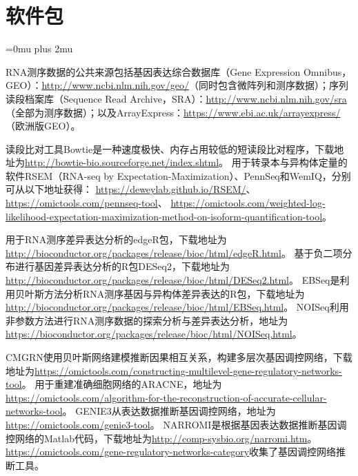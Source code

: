 \section*{软件包}
\begingroup
\sloppy
\Urlmuskip=0mu plus 2mu\relax
\def\UrlBreaks{\do\/\do\-\do\.\do\_\do\?\do\&\do\=\do\a\do\b\do\c\do\d\do\e\do\f\do\g\do\h\do\i\do\j\do\k\do\l\do\m\do\n\do\o\do\p\do\q\do\r\do\s\do\t\do\u\do\v\do\w\do\x\do\y\do\z\do\A\do\B\do\C\do\D\do\E\do\F\do\G\do\H\do\I\do\J\do\K\do\L\do\M\do\N\do\O\do\P\do\Q\do\R\do\S\do\T\do\U\do\V\do\W\do\X\do\Y\do\Z}

RNA测序数据的公共来源包括基因表达综合数据库（Gene Expression Omnibus，GEO）：\url{http://www.ncbi.nlm.nih.gov/geo/}（同时包含微阵列和测序数据）；序列读段档案库（Sequence Read Archive，SRA）：\url{http://www.ncbi.nlm.nih.gov/sra}（全部为测序数据）；以及ArrayExpress：\url{https://www.ebi.ac.uk/arrayexpress/}（欧洲版GEO）。

读段比对工具Bowtie是一种速度极快、内存占用较低的短读段比对程序，下载地址为\url{http://bowtie-bio.sourceforge.net/index.shtml}。
用于转录本与异构体定量的软件RSEM（RNA-seq by Expectation-Maximization）、PennSeq和WemIQ，分别可从以下地址获得：
\url{https://deweylab.github.io/RSEM/}、
\url{https://omictools.com/pennseq-tool}、
\url{https://omictools.com/weighted-log-likelihood-expectation-maximization-method-on-isoform-quantification-tool}。

用于RNA测序差异表达分析的edgeR包，下载地址为\url{http://bioconductor.org/packages/release/bioc/html/edgeR.html}。
基于负二项分布进行基因差异表达分析的R包DESeq2，下载地址为\url{http://bioconductor.org/packages/release/bioc/html/DESeq2.html}。
EBSeq是利用贝叶斯方法分析RNA测序基因与异构体差异表达的R包，下载地址为\url{http://bioconductor.org/packages/release/bioc/html/EBSeq.html}。
NOISeq利用非参数方法进行RNA测序数据的探索分析与差异表达分析，地址为\url{https://bioconductor.org/packages/release/bioc/html/NOISeq.html}。

CMGRN使用贝叶斯网络建模推断因果相互关系，构建多层次基因调控网络，下载地址为\url{https://omictools.com/constructing-multilevel-gene-regulatory-networks-tool}。
用于重建准确细胞网络的ARACNE，地址为\url{https://omictools.com/algorithm-for-the-reconstruction-of-accurate-cellular-networks-tool}。
GENIE3从表达数据推断基因调控网络，地址为\url{https://omictools.com/genie3-tool}。
NARROMI是根据基因表达数据推断基因调控网络的Matlab代码，下载地址为\url{http://comp-sysbio.org/narromi.htm}。
\url{https://omictools.com/gene-regulatory-networks-category}收集了基因调控网络推断工具。

